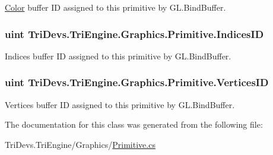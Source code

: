\hyperlink{struct_tri_devs_1_1_tri_engine_1_1_color}{Color} buffer I\-D assigned to this primitive by G\-L.\-Bind\-Buffer. 

\hypertarget{class_tri_devs_1_1_tri_engine_1_1_graphics_1_1_primitive_a2cc647531c7713b290d09b0131c48411}{
\subsubsection[{Indices\-I\-D}]{\setlength{\rightskip}{0pt plus 5cm}uint Tri\-Devs.\-Tri\-Engine.\-Graphics.\-Primitive.\-Indices\-I\-D\hspace{0.3cm}{\ttfamily [get]}}}\label{class_tri_devs_1_1_tri_engine_1_1_graphics_1_1_primitive_a2cc647531c7713b290d09b0131c48411}


Indices buffer I\-D assigned to this primitive by G\-L.\-Bind\-Buffer. 

\hypertarget{class_tri_devs_1_1_tri_engine_1_1_graphics_1_1_primitive_ab69b6bf1de5e766b83c4dbc19604cd3e}{
\subsubsection[{Vertices\-I\-D}]{\setlength{\rightskip}{0pt plus 5cm}uint Tri\-Devs.\-Tri\-Engine.\-Graphics.\-Primitive.\-Vertices\-I\-D\hspace{0.3cm}{\ttfamily [get]}}}\label{class_tri_devs_1_1_tri_engine_1_1_graphics_1_1_primitive_ab69b6bf1de5e766b83c4dbc19604cd3e}


Vertices buffer I\-D assigned to this primitive by G\-L.\-Bind\-Buffer. 



The documentation for this class was generated from the following file\-:\begin{DoxyCompactItemize}
\item 
Tri\-Devs.\-Tri\-Engine/\-Graphics/\hyperlink{_primitive_8cs}{Primitive.\-cs}\end{DoxyCompactItemize}
